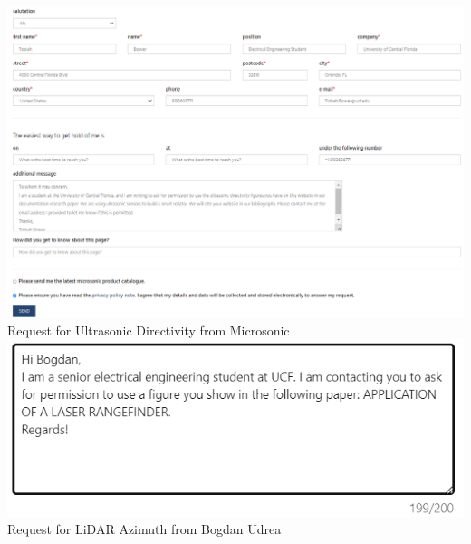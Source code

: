 
\begin{center}
\includegraphics[width=\textwidth]{./Images/permit1.png}
\newline Request for Ultrasonic Directivity from Microsonic\\

\includegraphics[width=\textwidth]{./Images/permit2.png}
\newline Request for LiDAR Azimuth from Bogdan Udrea\\
\end{center}